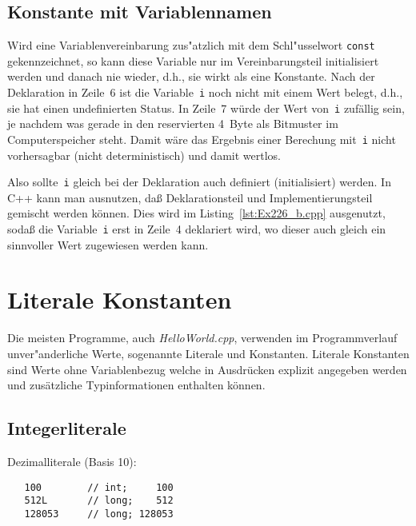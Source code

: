 \subsection{Konstante mit Variablennamen}
\label{p:2.2.6}
%
%
Wird eine Variablenvereinbarung zus"atzlich mit dem
Schl"usselwort \texttt{const} gekennzeichnet, so kann diese
Variable nur im Vereinbarungsteil initialisiert werden und danach nie
wieder, d.h., sie wirkt als eine Konstante.
%
Nach der Deklaration in Zeile~6 ist die Variable~\texttt{i} noch nicht mit einem Wert belegt,
d.h., sie hat einen undefinierten Status.
In Zeile~7 würde der Wert von~\texttt{i} zufällig sein, je nachdem was gerade
in den reservierten 4~Byte als Bitmuster im Computerspeicher steht.
Damit wäre das Ergebnis einer Berechung mit~\texttt{i} nicht vorhersagbar
(nicht deterministisch) und damit wertlos.

Also sollte~\texttt{i} gleich bei der Deklaration auch definiert (initialisiert) werden.
In C++ kann man ausnutzen, daß Deklarationsteil und Implementierungsteil gemischt werden können.
Dies wird im Listing~\ref{lst:Ex226_b.cpp} ausgenutzt, sodaß die Variable~\texttt{i}
erst in Zeile~4 deklariert wird, wo dieser auch gleich ein sinnvoller
Wert zugewiesen werden kann.
%
%
%
\section{Literale Konstanten}
\label{p:2.22}
%
Die meisten Programme, auch \textit{HelloWorld.cpp}, verwenden
im Programmverlauf unver"anderliche Werte, sogenannte Literale und Konstanten.
Literale Konstanten sind Werte ohne Variablenbezug welche in Ausdrücken explizit angegeben werden und zusätzliche
Typinformationen enthalten können.
%
\subsection{Integerliterale}
\label{p:2.22.1}
%
Dezimalliterale (Basis 10): \hfill
\begin{minipage}[t] {0.5\textwidth}
\begin{verbatim}
   100        // int;     100
   512L       // long;    512
   128053     // long; 128053
\end{verbatim}
\end{minipage}

